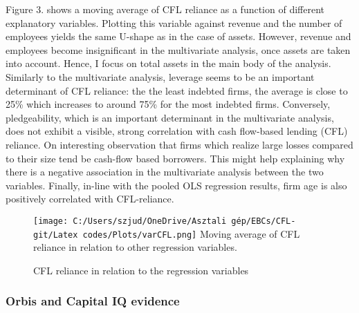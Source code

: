\documentclass[12pt]{article}
\begin{document}
\noindent Figure 3. shows a moving average of CFL reliance as a function  of different explanatory variables. Plotting this variable against revenue and the number of employees yields the same U-shape as in the case of assets. However, revenue and employees become insignificant in the multivariate analysis, once assets are taken into account. Hence, I focus on total assets in the main body of the analysis. Similarly to the multivariate analysis, leverage seems to be an important determinant of CFL reliance: the the least indebted firms, the average is close to 25\% which increases to around 75\% for the most indebted firms. Conversely, pledgeability, which is an important determinant in the multivariate analysis, does not exhibit a visible, strong correlation with cash flow-based lending (CFL) reliance. On interesting observation that firms which realize large losses compared to their size tend be cash-flow based borrowers. This might help explaining why there is a negative association in the multivariate analysis between the two variables. Finally, in-line with the pooled OLS regression results, firm age is also positively correlated with CFL-reliance.

\begin{figure}[H]  %
    \centering
    \caption{CFL reliance in relation to the regression variables} \label{chart:CFL}
    \texttt{[image: C:/Users/szjud/OneDrive/Asztali gép/EBCs/CFL-git/Latex codes/Plots/varCFL.png]}
     \small Moving average of CFL reliance in relation to other regression variables.
\end{figure}

\newpage

\subsubsection{Orbis and Capital IQ evidence}
\end{document}
